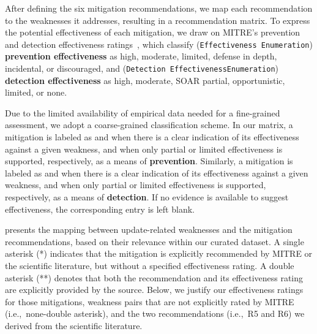 \documentclass[fleqn,s1,names,tex]{neptune}
\begin{document}
After defining the six mitigation recommendations, we map each recommendation to the weaknesses it addresses, resulting in a recommendation matrix. 
To express the potential effectiveness of each mitigation, we draw on MITRE's
prevention and detection effectiveness ratings~\citep{CWE_Schema}, which
classify (\texttt{Effectiveness \ubrk Enumeration}) \textbf{prevention effectiveness}
as high, moderate, limited, defense in depth, incidental, or discouraged, and
(\texttt{Detection \ubrk EffectivenessEnumeration}) \textbf{detection effectiveness}
as high, moderate, SOAR partial, opportunistic, limited, or none.




Due to the limited availability of empirical data needed for a fine-grained assessment, we adopt a coarse-grained classification scheme. 
In our matrix, a mitigation is  labeled as  and \ubrk  {}
when there is a clear indication of its effectiveness against a given weakness, and when only partial or limited effectiveness is supported, respectively, as a means of \textbf{prevention}.
Similarly,  a mitigation is labeled as   and  when there is a clear indication of its effectiveness against a given weakness, and when only partial or limited effectiveness is supported, respectively, as a means of \textbf{detection}.
If no evidence is available to suggest effectiveness, the corresponding entry is left blank.






  presents the mapping between update-related weaknesses and the mitigation recommendations, based on their relevance within our curated dataset. 
A single asterisk (*) indicates that the mitigation is explicitly recommended by MITRE or the scientific literature, but without a specified effectiveness rating. 
A double asterisk (**) denotes that both the recommendation and its effectiveness rating are explicitly provided by the source.
Below, we justify our effectiveness ratings for those mitigations, weakness pairs that are not explicitly rated by MITRE (i.e.,~none-double asterisk),  and the two recommendations (i.e.,~R5 and R6) we derived from the scientific literature.
\end{document}
